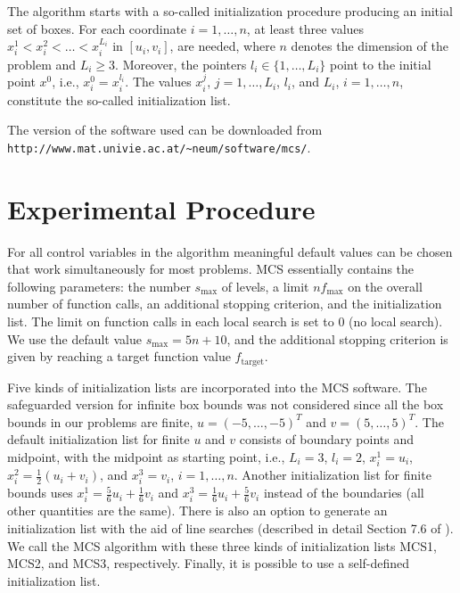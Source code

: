 \documentclass{sig-alternate}
\begin{document}
The algorithm starts with a so-called initialization procedure producing an 
initial set of boxes. For each coordinate $i =1,\dots,n$, at least three values
$x_i^1 < x_i^2 < \dots < x_i^{L_i}$ in $[u_i,v_i]$, are needed, where $n$ denotes 
the dimension of the problem and $L_i \ge 3$. Moreover, the pointers $l_i \in 
\{1,\dots,L_i\}$ point to the initial point $x^0$, i.e., $x_i^0 = x_i^{l_i}$. The
values $x_i^j$, $j=1,\dots,L_i$, $l_i$, and $L_i$, $i=1,\dots,n$, constitute the
so-called initialization list.

The version of the software used can be downloaded from
\verb|http://www.mat.univie.ac.at/~neum/software/mcs/|.


\section{Experimental Procedure}
%
For all control variables in the algorithm meaningful default values can be 
chosen that work simultaneously for most problems. MCS essentially contains 
the following parameters: the number $s_{\max}$ of levels, a limit $nf_{\max}$ on the 
overall number of function calls, an additional stopping criterion, and the 
initialization list. The limit on function calls in each local search is set to 0
(no local search). We use the default value $s_{\max} = 5n+10$, and the additional 
stopping criterion is given by reaching a target function value $f_\text{target}$.

Five kinds of initialization lists are incorporated into the MCS software. The 
safeguarded version for infinite box bounds was not considered since all the box
bounds in our problems are finite, $u = (-5,\dots,-5)^T$ and $v = (5,\dots,5)^T$. 
The default initialization list for finite $u$ and $v$ consists of boundary points and
midpoint, with the midpoint as starting point, i.e., $L_i=3$, $l_i = 2$, $x_i^1 = u_i$,
$x_i^2 = \frac12(u_i+v_i)$, and $x_i^3 = v_i$, $i=1,\dots,n$. 
Another initialization list for finite bounds uses $x_i^1 = \frac56 u_i + \frac16 v_i$ and $x_i^3 = \frac16
u_i + \frac56 v_i$ instead of the boundaries (all other quantities are the same).
There is also an option to generate an initialization list with the aid of line
searches (described in detail Section 7.6 of \cite{mcs}). We call the
MCS algorithm with these three kinds of initialization lists MCS1, MCS2, and MCS3,
respectively. Finally, it is
possible to use a self-defined initialization list. 
\end{document}
